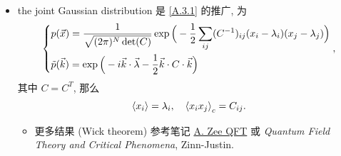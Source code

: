 \begin{itemize}
	\item the joint Gaussian distribution 是 \eqref{A.3.1} 的推广, 为
	\begin{equation}
		\begin{dcases}
			p(\vec{x}) = \frac{1}{\sqrt{(2 \pi)^N \det(C)}} \exp \Big( - \frac{1}{2} \sum_{i j} (C^{- 1})_{i j} (x_i - \lambda_i) (x_j - \lambda_j) \Big) \\
			\tilde{p}(\vec{k}) = \exp \Big( - i \vec{k} \cdot \vec{\lambda} - \frac{1}{2} \vec{k} \cdot C \cdot \vec{k} \Big)
		\end{dcases},
	\end{equation}
	其中 $C = C^T$, 那么
	\begin{equation}
		\braket{x_i} = \lambda_i, \quad \braket{x_i x_j}_c = C_{i j}.
	\end{equation}
	\begin{itemize}
		\item 更多结果 (Wick theorem) 参考笔记 \href{https://github.com/siyang03/my-note---A.-Zee-QFT}{A. Zee QFT} 或 \textit{Quantum Field Theory and Critical Phenomena}, Zinn-Justin.
	\end{itemize}
\end{itemize}

